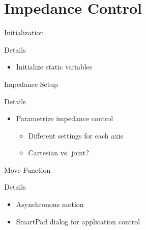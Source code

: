 \documentclass{beamer}
\begin{document}
\section{Impedance Control}

\begin{frame}{Initialization}

  \begin{block}{Details}
    \begin{itemize}
      \item Initialize static variables
    \end{itemize}
  \end{block}
\end{frame}

\begin{frame}{Impedance Setup}

  \begin{block}{Details}
    \begin{itemize}
      \item Parametrize impedance control
      \begin{itemize}
        \item Different settings for each axis
        \item Cartesian vs. joint?
      \end{itemize}
    \end{itemize}
  \end{block}
\end{frame}

\begin{frame}{Move Function}

  \begin{block}{Details}
    \begin{itemize}
      \item Asynchronous motion
      \item SmartPad dialog for application control
    \end{itemize}
  \end{block}
\end{frame}
\end{document}
